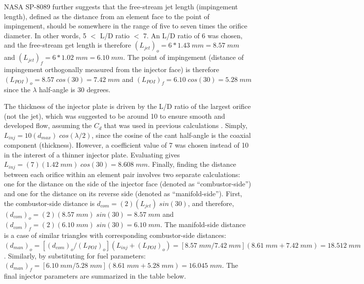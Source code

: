\documentclass[9pt]{article} %
\numberwithin{equation}{section} %
\begin{document}
NASA SP-8089 further suggests that the free-stream jet length (impingement length), defined as the distance from an element face to the point of impingement, should be somewhere in the range of five to seven times the orifice diameter. In other words, 5 $<$ L/D ratio $<$ 7. An L/D ratio of 6 was chosen, and the free-stream get length is therefore $(L_{jet})_{o} = 6 * 1.43 \; mm = 8.57 \; mm$ and $(L_{jet})_{f} = 6 * 1.02 \; mm = 6.10 \; mm$. The point of impingement (distance of impingement orthogonally measured from the injector face) is therefore $(L_{POI})_{o} = 8.57 \; cos(30) = 7.42 \; mm$ and $(L_{POI})_{f} = 6.10 \; cos(30) = 5.28 \; mm$ since the $\lambda$ half-angle is 30 degrees. 

The thickness of the injector plate is driven by the L/D ratio of the largest orifice (not the jet), which was suggested to be around 10 to ensure smooth and developed flow, assuming the $C_{d}$ that was used in previous calculations \cite{rpe}. Simply, $L_{inj} = 10(d_{max}) \; cos(\lambda /2)$, since the cosine of the cant half-angle is the coaxial component (thickness). However, a coefficient value of 7 was chosen instead of 10 in the interest of a thinner injector plate. Evaluating gives $L_{inj} = (7)(1.42 \; mm) \; cos(30) = 8.608 \; mm$. Finally, finding the distance between each orifice within an element pair involves two separate calculations: one for the distance on the side of the injector face (denoted as ``combustor-side'') and one for the distance on its reverse side (denoted as ``manifold-side''). First, the combustor-side distance is $d_{com} = (2)(L_{jet}) \; sin(30)$, and therefore, $(d_{com})_{o} = (2)(8.57 \; mm) \; sin(30) = 8.57 \; mm$ and $(d_{com})_{f} = (2)(6.10 \; mm) \; sin(30) = 6.10 \; mm$. The manifold-side distance is a case of similar triangles with corresponding combustor-side distances: $(d_{man})_{o} = [(d_{com})_{o}/(L_{POI})_{o}](L_{inj} + (L_{POI})_{o}) = [8.57 \; mm/7.42 \; mm](8.61 \; mm + 7.42 \; mm) = 18.512  \; mm$. Similarly, by substituting for fuel parameters: $(d_{man})_{f} = [6.10 \; mm/5.28 \; mm](8.61 \; mm + 5.28 \; mm) = 16.045 \; mm$. The final injector parameters are summarized in the table below.
\end{document}
